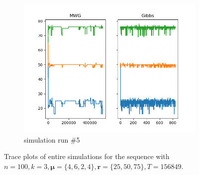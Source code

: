 \begin{figure}[H]
\begin{subfigure}{.3\textwidth}
    	\includegraphics[width=\linewidth]{../../plots/Trace_M4_N100_NMCMC3_seed4_diffind2.png}
    	\caption{simulation run \#5}
	\end{subfigure}
	\caption{Trace plots of entire simulations for the sequence with $n=100, k=3, \bm{\mu} = \{4, 6, 2,4\}, \bm{r} = \{25, 50, 75\}, T = 156849$.}
\end{figure}

